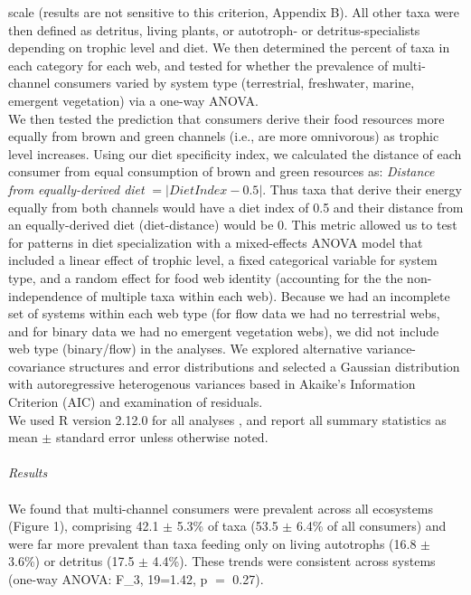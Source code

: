 \documentclass[12pt,a4paper,oneside]{article}
\begin{document}
scale (results are not sensitive to this criterion, Appendix B). All
other taxa were then defined as detritus, living plants, or 
autotroph- or detritus-specialists depending on trophic level and
diet. We then determined the percent of taxa in each category for each
web, and tested for whether the prevalence of multi-channel consumers
varied by system type (terrestrial, freshwater, marine, emergent
vegetation) via a one-way ANOVA.
\\
\indent We then tested the prediction that consumers derive their food resources more
equally from brown and green channels
(i.e., are more omnivorous) as trophic level
increases. Using our diet specificity index, we
calculated the distance of 
each consumer from equal consumption of brown and green resources as:
\emph{Distance from equally-derived diet} \(= |Diet Index-0.5|\). Thus taxa
that derive their energy equally from both channels would have
a diet index of 0.5 and their distance from an equally-derived diet
(diet-distance) would be 0. This metric allowed us to test for
patterns in diet specialization
with a mixed-effects ANOVA model that included a linear effect of
trophic level, a fixed categorical variable for system type, 
and a random effect for food web identity (accounting for the the non-independence of multiple taxa within each web). Because we had an
incomplete set of systems within each
web type (for flow data we had no terrestrial webs, and for binary data
we had no emergent vegetation webs), we did not include web type
(binary/flow) in the analyses. We explored alternative
variance-covariance structures and error distributions
\citep{Bolker:2009, Wolfinger:1996} 
and selected a Gaussian distribution with
autoregressive heterogenous variances based in
Akaike's Information Criterion (AIC) and examination
of residuals. 
\\ 
\indent We used R version 2.12.0 for all
analyses \citep{Rcore:2010}, and report all summary statistics as mean ${\pm}$
standard error unless otherwise noted.
\\
\\
\emph{Results}\\
\\
\indent We found that multi-channel consumers were prevalent across all ecosystems
(Figure 1), comprising 42.1 ${\pm}$ 5.3\% of taxa (53.5 ${\pm}$ 6.4\%
of all consumers) and were far more
prevalent than taxa feeding only on living
autotrophs (16.8 ${\pm}$ 3.6\%) or detritus (17.5 ${\pm}$ 4.4\%). These
trends were consistent across systems (one-way ANOVA:
F_{3, 19}=1.42, p \(=\) 0.27).
\end{document}
